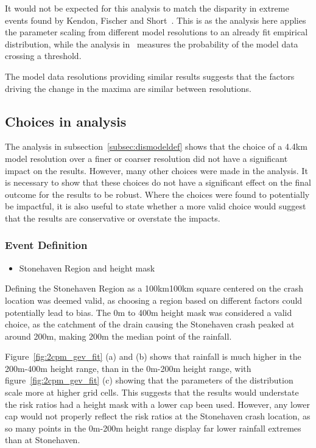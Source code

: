It would not be expected for this analysis to match the disparity in extreme events found by Kendon, Fischer and Short~\cite{Kendon_Fischer_Short_2023}.
This is as the analysis here applies the parameter scaling from different model resolutions to an already fit empirical distribution,
    while the analysis in~\cite{Kendon_Fischer_Short_2023} measures the probability of the model data crossing a threshold.

The model data resolutions providing similar results suggests that the factors driving the change in the maxima are similar between resolutions.

\subsection{Choices in analysis}\label{subsec:diseventdef}

The analysis in subsection~\ref{subsec:dismodeldef} shows that the choice of a 4.4km model resolution over a finer or coarser resolution
    did not have a significant impact on the results.
However,
    many other choices were made in the analysis.
It is necessary to show that these choices do not have a significant effect on the final outcome for the results to be robust.
Where the choices were found to potentially be impactful,
    it is also useful to state whether a more valid choice would suggest that the results are conservative or overstate the impacts.

\subsubsection{Event Definition}

\begin{itemize} \item Stonehaven Region and height mask \end{itemize}

Defining the Stonehaven Region as a 100km\times100km square centered on the crash location was deemed valid,
    as choosing a region based on different factors could potentially lead to bias.
The 0m to 400m height mask was considered a valid choice,
    as the catchment of the drain causing the Stonehaven crash peaked at around 200m,
    making 200m the median point of the rainfall.

Figure~\ref{fig:2cpm_gev_fit} (a) and (b) shows that rainfall is much higher in the 200m-400m height range,
    than in the 0m-200m height range,
    with figure~\ref{fig:2cpm_gev_fit} (c) showing that the parameters of the distribution scale more at higher grid cells.
This suggests that the results would understate the risk ratios had a height mask with a lower cap been used.
However, any lower cap would not properly reflect the risk ratios at the Stonehaven crash location,
    as so many points in the 0m-200m height range display far lower rainfall extremes than at Stonehaven.


